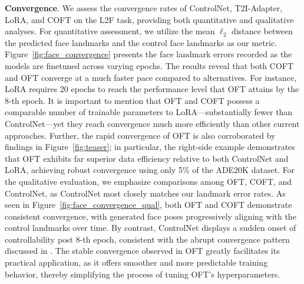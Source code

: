 \textbf{Convergence}. We assess the convergence rates of ControlNet, T2I-Adapter, LoRA, and COFT on the L2F task, providing both quantitative and qualitative analyses. For quantitative assessment, we utilize the mean $\ell_2$ distance between the predicted face landmarks and the control face landmarks as our metric. Figure~\ref{fig:face_convergence} presents the face landmark errors recorded as the models are finetuned across varying epochs. The results reveal that both COFT and OFT converge at a much faster pace compared to alternatives. For instance, LoRA requires 20 epochs to reach the performance level that OFT attains by the 8-th epoch. It is important to mention that OFT and COFT possess a comparable number of trainable parameters to LoRA—substantially fewer than ControlNet—yet they reach convergence much more efficiently than other current approaches. Further, the rapid convergence of OFT is also corroborated by findings in Figure~\ref{fig:teaser}; in particular, the right-side example demonstrates that OFT exhibits far superior data efficiency relative to both ControlNet and LoRA, achieving robust convergence using only 5\% of the ADE20K dataset. For the qualitative evaluation, we emphasize comparisons among OFT, COFT, and ControlNet, as ControlNet most closely matches our landmark error rates. As seen in Figure~\ref{fig:face_convergence_qual}, both OFT and COFT demonstrate consistent convergence, with generated face poses progressively aligning with the control landmarks over time. By contrast, ControlNet displays a sudden onset of controllability post 8-th epoch, consistent with the abrupt convergence pattern discussed in \cite{zhang2023adding}. The stable convergence observed in OFT greatly facilitates its practical application, as it offers smoother and more predictable training behavior, thereby simplifying the process of tuning OFT’s hyperparameters.

